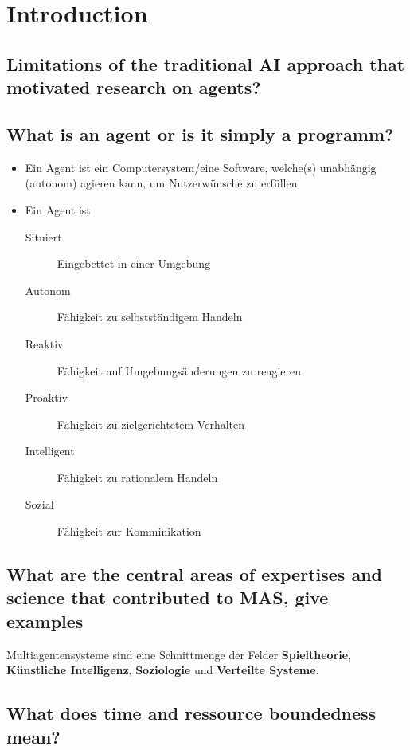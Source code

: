 \section{Introduction}
\subsection{Limitations of the traditional AI approach that motivated research on agents?}
\subsection{What is an agent or is it simply a programm?}
\label{subsec:agentvsprogram}
\begin{itemize}
	\item Ein Agent ist ein Computersystem/eine Software, welche(s) unabhängig (autonom) agieren kann, um Nutzerwünsche zu erfüllen
	\item Ein Agent ist \begin{description}
		\item[Situiert] Eingebettet in einer Umgebung
		\item[Autonom] Fähigkeit zu selbstständigem Handeln
		\item[Reaktiv] Fähigkeit auf Umgebungsänderungen zu reagieren
		\item[Proaktiv] Fähigkeit zu zielgerichtetem Verhalten
		\item[Intelligent] Fähigkeit zu rationalem Handeln
		\item[Sozial] Fähigkeit zur Komminikation
	\end{description}
\end{itemize}
\subsection{What are the central areas of expertises and science that contributed to MAS, give examples}
Multiagentensysteme sind eine Schnittmenge der Felder \textbf{Spieltheorie}, \textbf{Künstliche Intelligenz}, \textbf{Soziologie} und \textbf{Verteilte Systeme}.
\subsection{What does time and ressource boundedness mean?}
